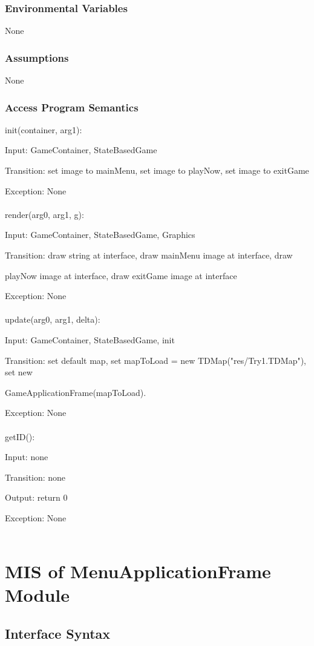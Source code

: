 \documentclass[12,english]{article}
\begin{document}
		\subsubsection{Environmental Variables}
		None
		\subsubsection{Assumptions}
        None

		\subsubsection{Access Program Semantics}
		init(container, arg1):
		
		Input: GameContainer, StateBasedGame
		
		Transition: set image to mainMenu, set image to playNow, set image to exitGame
		
		Exception: None\\
		\\
		render(arg0, arg1, g):
		
		Input: GameContainer, StateBasedGame, Graphics
		
		Transition: draw string at interface, draw mainMenu image at interface, draw 
		
		playNow image at interface, draw exitGame image at interface
		
		Exception: None\\
		\\	
		update(arg0, arg1, delta):
		
		Input: GameContainer, StateBasedGame, init
		
		Transition: set default map, set mapToLoad = new TDMap("res/Try1.TDMap"), set new
		
		GameApplicationFrame(mapToLoad).
		
		Exception: None\\
		\\
		getID():
		
		Input: none
		
		Transition: none
		
		Output: return 0
		
		Exception: None\\
		\\	
\section{MIS of MenuApplicationFrame Module}
	\subsection{Interface Syntax}
\end{document}
